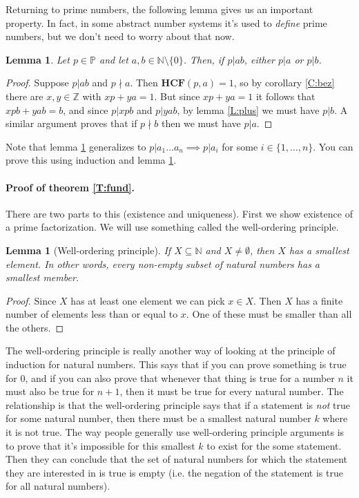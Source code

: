 \documentclass{article}
\theoremstyle{plain}
\newtheorem{lemma}[theorem]{Lemma}{\bfseries}{\upshape}
\newcommand{\bN}{\mathbb{N}}
\newcommand{\bZ}{\mathbb{Z}}
\newcommand{\bP}{\mathbb{P}}
\newcommand{\HCF}{\mathbf{HCF}}
\newcommand*{\prefix}{}
\begin{document}
Returning to prime numbers, the following lemma gives us an important property. In fact, in some abstract number systems it's used to \emph{define} prime numbers, but we don't need to worry about that now.
\begin{lemma}\label{\prefix L:div2}
Let $p\in \bP$ and let $a,b\in\bN\setminus\{0\}$. Then, if $p|ab$, either $p|a$ or $p|b$.
\end{lemma}
\begin{proof}
 Suppose $p|ab$ and $p\nmid a$. Then $\HCF(p,a)=1$, so by corollary \ref{C:bez} there are $x,y\in\bZ$ with $xp+ya = 1$. But since $xp+ya = 1$ it follows that $xpb+yab = b$, and since $p|xpb$ and $p|yab$, by lemma \ref{L:plus} we must have $p|b$. A similar argument proves that if $p\nmid b$ then we must have $p|a$. 
\end{proof}

Note that lemma \ref{L:div2} generalizes to $p|a_1\ldots a_n\implies p|a_i$ for some $i\in \{1,\ldots,n\}$. You can prove this using induction and lemma \ref{L:div2}.  

\paragraph{Proof of theorem \ref{T:fund}.} There are two parts to this (existence and uniqueness). First we show existence of a prime factorization. We will use something called the well-ordering principle.

\begin{lemma}[Well-ordering principle]\label{\prefix L:well}
If $X\subseteq \bN$ and $X\neq \emptyset$, then $X$ has a smallest element. In other words, every non-empty subset of natural numbers has a smallest member.
\end{lemma}
\begin{proof}
Since $X$ has at least one element we can pick $x\in X$. Then $X$ has a finite number of elements less than or equal to $x$. One of these must be smaller than all the others.
\end{proof}

The well-ordering principle is really another way of looking at the principle of induction for natural numbers. This says that if you can prove something is true for 0, and if you can also prove that whenever that thing is true for a number $n$ it must also be true for $n+1$, then it must be true for every natural number. The relationship is that the well-ordering principle says that if a statement is \emph{not} true for some natural number, then there must be a smallest natural number $k$ where it is not true. The way people generally use well-ordering principle arguments is to prove that it's impossible for this smallest $k$ to exist for the some statement. Then they can conclude that the set of natural numbers for which the statement they are interested in is true is empty (i.e. the negation of the statement is true for all natural numbers).
\end{document}
